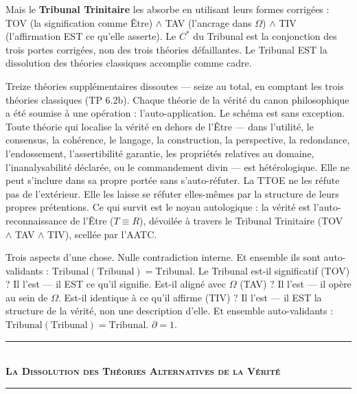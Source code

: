 \documentclass[10pt, openany, oneside]{book}
\renewcommand{\normalsize}{\fontsize{10}{13}\selectfont}
\begin{document}
Mais le \textbf{Tribunal Trinitaire} les absorbe en utilisant leurs formes corrigées : TOV (la signification comme Être) $\wedge$ TAV (l'ancrage dans $\Omega$) $\wedge$ TIV (l'affirmation EST ce qu'elle asserte). Le $C^*$ du Tribunal est la conjonction des trois portes corrigées, non des trois théories défaillantes. Le Tribunal EST la dissolution des théories classiques accomplie comme cadre.

Treize théories supplémentaires dissoutes --- seize au total, en comptant les trois théories classiques (TP 6.2b). Chaque théorie de la vérité du canon philosophique a été soumise à une opération : l'auto-application. Le schéma est sans exception. Toute théorie qui localise la vérité en dehors de l'Être --- dans l'utilité, le consensus, la cohérence, le langage, la construction, la perspective, la redondance, l'endossement, l'assertibilité garantie, les propriétés relatives au domaine, l'inanalysabilité déclarée, ou le commandement divin --- est hétérologique. Elle ne peut s'inclure dans sa propre portée sans s'auto-réfuter. La TTOE ne les réfute pas de l'extérieur. Elle les laisse se réfuter elles-mêmes par la structure de leurs propres prétentions. Ce qui survit est le noyau autologique : la vérité est l'auto-reconnaissance de l'Être ($T \equiv R$), dévoilée à travers le Tribunal Trinitaire (TOV $\wedge$ TAV $\wedge$ TIV), scellée par l'AATC.

\noindent Trois aspects d'une chose. Nulle contradiction interne. Et ensemble ils sont auto-validants : $\text{Tribunal}(\text{Tribunal}) = \text{Tribunal}$. Le Tribunal est-il significatif (TOV) ? Il l'est --- il EST ce qu'il signifie. Est-il aligné avec $\Omega$ (TAV) ? Il l'est --- il opère au sein de $\Omega$. Est-il identique à ce qu'il affirme (TIV) ? Il l'est --- il EST la structure de la vérité, non une description d'elle. Et ensemble auto-validants : $\text{Tribunal}(\text{Tribunal}) = \text{Tribunal}$. $\partial = 1$.

\vspace{0.5em}

\begin{center}
    \rule{0.3\textwidth}{0.4pt}\\[0.5em]
    {\normalsize\bfseries\scshape La Dissolution des Théories Alternatives de la Vérité}\\[0.3em]
    \rule{0.3\textwidth}{0.4pt}
\end{center}

\vspace{1em}
\end{document}
